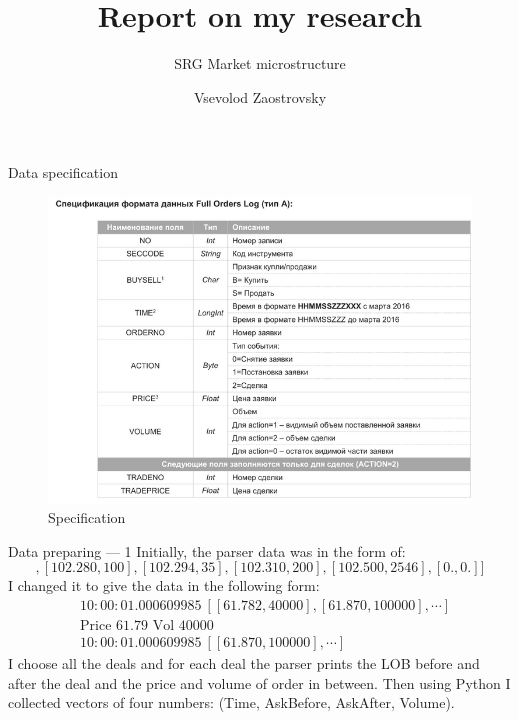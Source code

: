\documentclass[aspectratio=169]{beamer}
\title{Report on my research}
\subtitle{SRG Market microstructure}
\author{Vsevolod Zaostrovsky}
\institute{Vega Institute Foundation}
\begin{document}
\maketitle

\begin{frame}{Data specification}
    \begin{figure}
        \includegraphics[scale=0.55]{figs/spec.png}
        \caption{Specification}
        \label{fig:mvslim}
    \end{figure}
\end{frame}

\begin{frame}{Data preparing --- 1}
        Initially, the parser data was in the form of:
        \begin{equation*}
            [[ 102.260, 50 ], [ 102.280, 100 ], [ 102.294, 35 ], [ 102.310, 200 ], [ 102.500, 2546 ], [0., 0.]]
        \end{equation*}
        I changed it to give the data in the following form:
        \begin{align*}
            & 10:00:01.000609985 \ [[ 61.782, 40000 ], [ 61.870, 100000 ], \cdots] \\
            & \textrm{Price } 61.79 \textrm{ Vol } 40000  \\
            & 10:00:01.000609985 \ [[ 61.870, 100000 ], \cdots]
        \end{align*}
        I choose all the deals and for each deal the parser prints the LOB before and after the deal
        and the price and volume of order in between.  
        Then using Python I collected vectors of four numbers: 
        (Time, AskBefore, AskAfter, Volume).
\end{frame}
\end{document}
